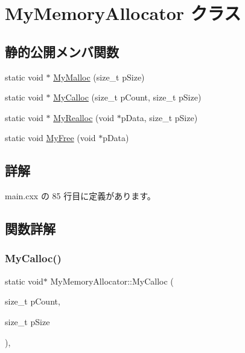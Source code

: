 \hypertarget{class_my_memory_allocator}{}\section{My\+Memory\+Allocator クラス}
\label{class_my_memory_allocator}
\subsection*{静的公開メンバ関数}
\begin{DoxyCompactItemize}
\item 
static void $\ast$ \hyperlink{class_my_memory_allocator_ab04e127ff4f952b64294f31a80997860}{My\+Malloc} (size\+\_\+t p\+Size)
\item 
static void $\ast$ \hyperlink{class_my_memory_allocator_a0122e2dcc836dc6cdac8fc1e61c8fbdc}{My\+Calloc} (size\+\_\+t p\+Count, size\+\_\+t p\+Size)
\item 
static void $\ast$ \hyperlink{class_my_memory_allocator_a1ab26aac36e046c768e9a1c8a55d1d32}{My\+Realloc} (void $\ast$p\+Data, size\+\_\+t p\+Size)
\item 
static void \hyperlink{class_my_memory_allocator_af96d6b0178ab01af892c68d2cfa23ced}{My\+Free} (void $\ast$p\+Data)
\end{DoxyCompactItemize}


\subsection{詳解}


 main.\+cxx の 85 行目に定義があります。



\subsection{関数詳解}
\mbox{\label{class_my_memory_allocator_a0122e2dcc836dc6cdac8fc1e61c8fbdc}} 
\subsubsection{\texorpdfstring{My\+Calloc()}{MyCalloc()}}
{\footnotesize\ttfamily static void$\ast$ My\+Memory\+Allocator\+::\+My\+Calloc (\begin{DoxyParamCaption}\item[{size\+\_\+t}]{p\+Count,  }\item[{size\+\_\+t}]{p\+Size }\end{DoxyParamCaption})\hspace{0.3cm}{\ttfamily [inline]}, {\ttfamily [static]}}



